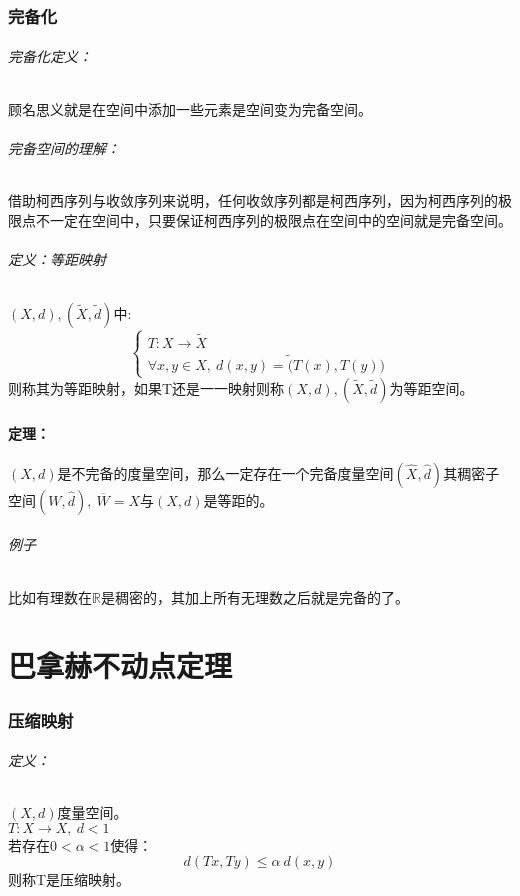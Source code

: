 \documentclass[11pt]{article}
\begin{document}
\begin{CJK*}{UTF8}{gbsn}
\section{完备化}
\paragraph{完备化定义：}顾名思义就是在空间中添加一些元素是空间变为完备空间。
\paragraph{完备空间的理解：}借助柯西序列与收敛序列来说明，任何收敛序列都是柯西序列，因为柯西序列的极限点不一定在空间中，只要保证柯西序列的极限点在空间中的空间就是完备空间。
\paragraph{定义：等距映射}$(X,d),(\tilde{X},\tilde{d} )$中:
\begin{equation*}
	\begin{cases}
		T:X\rightarrow \tilde{X}\\
		\forall x,y \in X, ~d(x,y)=\tilde(T(x),T(y))
	\end{cases}
\end{equation*}
则称其为等距映射，如果T还是一一映射则称$(X,d),(\tilde{X},\tilde{d} )$为等距空间。
\subsection{定理：}$(X,d)$是不完备的度量空间，那么一定存在一个完备度量空间$(\hat X,\hat d )$其稠密子空间$(W,\hat d),~\overline{W}=X$与$(X,d)$是等距的。
\paragraph{例子}比如有理数在$\mathbb{R}$是稠密的，其加上所有无理数之后就是完备的了。
\pagebreak
\part{巴拿赫不动点定理}
\setcounter{section}{0}
\section{压缩映射}
\paragraph{定义：}$(X,d)$度量空间。\\
$T:X\rightarrow X,~d<1$\\
若存在$0<\alpha <1$使得：\\
\begin{equation*}
	d(Tx,Ty)\leq \alpha~d(x,y)
\end{equation*}
则称T是压缩映射。

\end{CJK*}
\end{document}
